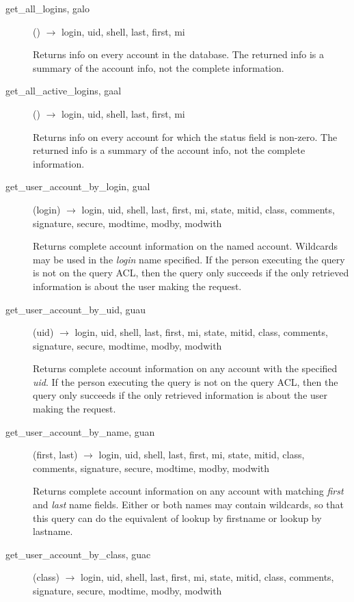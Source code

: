 \documentclass{article}
\begin{document}
\begin{description}
\item[get\_all\_logins, galo]() $\rightarrow$ login, uid, shell, last, first, mi

Returns info on every account in the database.  The returned info is a
summary of the account info, not the complete information.

\item[get\_all\_active\_logins, gaal]() $\rightarrow$ login, uid, shell, last, first, mi

Returns info on every account for which the status field is non-zero.
The returned info is a summary of the account info, not the complete
information.

\item[get\_user\_account\_by\_login, gual](login) $\rightarrow$ login, uid,
shell, last, first, mi, state, mitid, class, comments, signature,
secure, modtime, modby, modwith

Returns complete account information on the named account.  Wildcards
may be used in the {\em login} name specified.  If the person executing
the query is not on the query ACL, then the query only succeeds if the
only retrieved information is about the user making the request.

\item[get\_user\_account\_by\_uid, guau](uid) $\rightarrow$ login, uid, shell,
last, first, mi, state, mitid, class, comments, signature, secure,
modtime, modby, modwith

Returns complete account information on any account with the specified
{\em uid}.  If the person executing the query is not on the query ACL,
then the query only succeeds if the only retrieved information is
about the user making the request.

\item[get\_user\_account\_by\_name, guan](first, last) $\rightarrow$ login, uid, shell,
last, first, mi, state, mitid, class, comments, signature, secure, modtime,
modby, modwith

Returns complete account information on any account with matching
{\em first} and {\em last} name fields.  Either or both names may contain
wildcards, so that this query can do the equivalent of lookup by
firstname or lookup by lastname.

\item[get\_user\_account\_by\_class, guac](class) $\rightarrow$ login, uid, shell, last,
first, mi, state, mitid, class, comments, signature, secure, modtime,
modby, modwith


\end{description}
\end{document}
